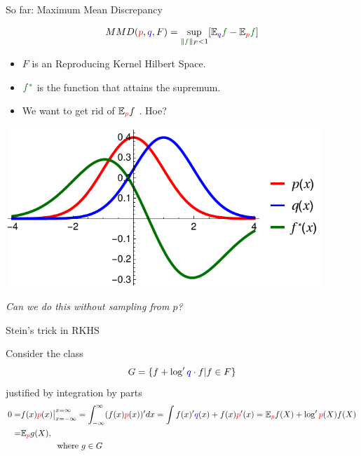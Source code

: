 \begin{frame}
\begin{columns}
\begin{column}{.33\linewidth}
\begin{block}{So far: Maximum Mean Discrepancy}
\begin{minipage}{.60\linewidth}
\vspace{1cm}
\large
\begin{align*}
MMD({\color{red} p},{ \color{blue} q},F) = \sup_{   \| {\color{mg}f} \|_F<1} [\ev_{{ \color{blue} q}}{\color{mg}f}- \ev_{{\color{red} p}}{\color{mg} f}]   
\end{align*}
\normalsize
\vspace{1cm}
 \begin{itemize}
  \item $F$ is an Reproducing Kernel Hilbert Space.
  \item ${\color{mg} f^*}$ is the function that attains the supremum.
  \item We want to get rid of  $\mathbb{E}_{ {\color{red} p} }f$ . Hoe?
 \end{itemize}

\end{minipage}
\begin{minipage}{.35\linewidth}
\begin{center}
\includegraphics[width=12cm,height=6cm]{../../presentation/img/mmd.pdf}
\end{center}
\end{minipage}
\vspace{1cm}
\begin{center}
\emph{Can we do this without sampling from $p$?}
\end{center}
\end{block}
\vspace{-0.75cm}
\begin{block}{Stein's trick in RKHS}

Consider the  class \large
$$G = \{ f  +  \log' { \color{blue} q} \cdot  f | f \in F \}$$
\normalsize
justified by integration by parts
\begin{align*}
 0= &  f(x) {\color{red} p}(x)  \big|_{x=-\infty}^{x=\infty} =  \int_{-\infty}^{\infty} (f(x) {\color{red} p}(x) )'  dx  =   \int   f(x)' { \color{blue} q}(x)   + f(x){\color{red} p}'(x)  = \mathbb{E}_{\color{red} p} f(X)  +  \log' {\color{red} p}(X) f(X) \\
   = & \mathbb{E}_{\color{red} p} g(X), \\
    & \quad \quad \quad  \quad  \text{ where } g \in G
\end{align*}


\end{block}
\end{column}
\end{columns}
\end{frame}
